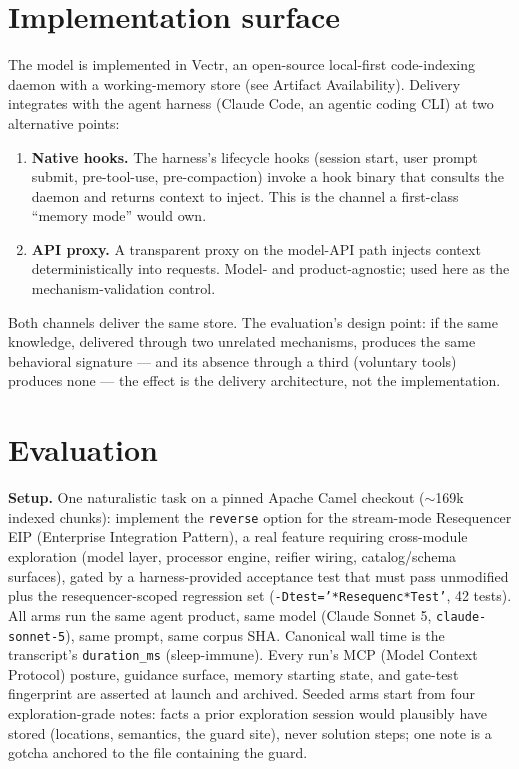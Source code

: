 \documentclass[11pt]{article}
\begin{document}
\section{Implementation surface}
\label{sec:surface}

The model is implemented in Vectr, an open-source local-first
code-indexing daemon with a working-memory store (see Artifact
Availability). Delivery integrates with the agent harness (Claude
Code, an agentic coding CLI) at two alternative points:

\begin{enumerate}
\item \textbf{Native hooks.} The harness's lifecycle hooks (session start, user
   prompt submit, pre-tool-use, pre-compaction) invoke a hook binary
   that consults the daemon and returns context to inject. This is the
   channel a first-class ``memory mode'' would own.
\item \textbf{API proxy.} A transparent proxy on the model-API path injects
   context deterministically into requests. Model- and product-agnostic;
   used here as the mechanism-validation control.
\end{enumerate}

Both channels deliver the same store. The evaluation's design point: if
the same knowledge, delivered through two unrelated mechanisms, produces
the same behavioral signature --- and its absence through a third
(voluntary tools) produces none --- the effect is the delivery
architecture, not the implementation.

\section{Evaluation}
\label{sec:eval}

\textbf{Setup.} One naturalistic task on a pinned Apache Camel checkout
($\sim$169k indexed chunks): implement the \texttt{reverse} option for the
stream-mode Resequencer EIP (Enterprise Integration Pattern), a real
feature requiring cross-module exploration (model layer, processor
engine, reifier wiring, catalog/schema surfaces), gated by a
harness-provided acceptance test that must pass unmodified plus the
resequencer-scoped regression set (\texttt{-Dtest='*Resequenc*Test'}, 42
tests). All arms run the same agent product, same model (Claude
Sonnet 5, \texttt{claude-sonnet-5}), same prompt, same corpus SHA. Canonical
wall time is the transcript's \texttt{duration\_ms} (sleep-immune). Every
run's MCP (Model Context Protocol) posture, guidance surface, memory
starting state, and gate-test fingerprint are asserted at launch and
archived. Seeded arms start from four exploration-grade notes: facts a
prior exploration session would plausibly have stored (locations,
semantics, the guard site), never solution steps; one note is a gotcha
anchored to the file containing the guard.
\end{document}
